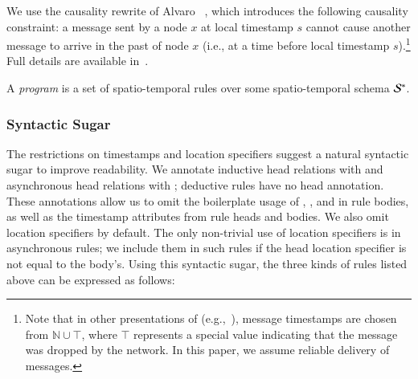 We use the causality rewrite of Alvaro \etal~\cite{ameloot-operational}, which introduces the following causality constraint: a message sent by a node $x$ at local timestamp $s$ cannot cause another message to arrive in the past of node $x$ (i.e., at a time before local timestamp $s$).\footnote{Note that in
  other presentations of \lang (e.g.,~\cite{dedalus}), message timestamps are
  chosen from $\mathbb{N} \cup \top$, where $\top$ represents a special value
  indicating that the message was dropped by the network. In this paper, we
  assume reliable delivery of messages.}  Full details are available in~\cite{ameloot-operational}.

A \lang \emph{program} is a set of spatio-temporal rules over some
spatio-temporal schema $\stschema$.  

\subsubsection{Syntactic Sugar}
The restrictions on timestamps and location specifiers suggest a natural
syntactic sugar to improve readability.  We annotate inductive head relations
with  and asynchronous head relations with ;
deductive rules have no head annotation.  These annotations allow us to omit the
boilerplate usage of , ,  and
 in rule bodies, as well as the timestamp attributes from rule
heads and bodies.  We also omit location specifiers by default. The only
non-trivial use of location specifiers is in asynchronous rules; we include them
in such rules if the head location specifier is not equal to the body's. Using
this syntactic sugar, the three kinds of rules listed above can be expressed as
follows:

